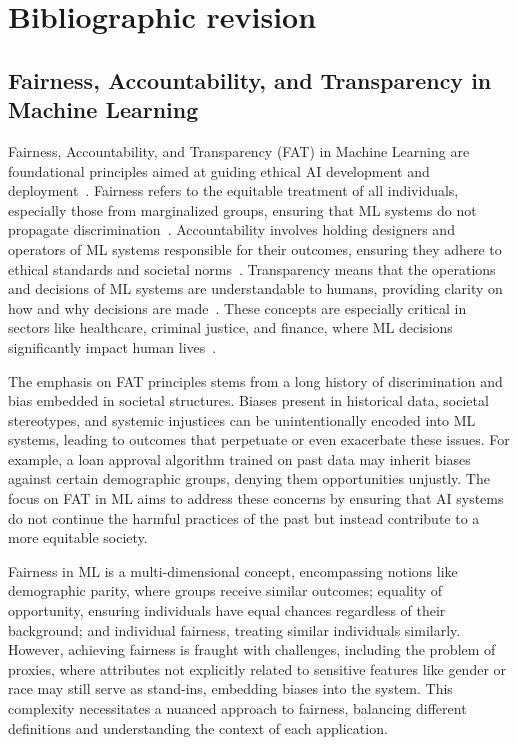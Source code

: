 
\chapter{Bibliographic revision}

\section{Fairness, Accountability, and Transparency in Machine Learning}

Fairness, Accountability, and Transparency (FAT) in Machine Learning are foundational principles aimed at guiding ethical AI development and deployment~\cite{}. Fairness refers to the equitable treatment of all individuals, especially those from marginalized groups, ensuring that ML systems do not propagate discrimination~\cite{}. Accountability involves holding designers and operators of ML systems responsible for their outcomes, ensuring they adhere to ethical standards and societal norms~\cite{}. Transparency means that the operations and decisions of ML systems are understandable to humans, providing clarity on how and why decisions are made~\cite{}. These concepts are especially critical in sectors like healthcare, criminal justice, and finance, where ML decisions significantly impact human lives~\cite{}.


The emphasis on FAT principles stems from a long history of discrimination and bias embedded in societal structures. Biases present in historical data, societal stereotypes, and systemic injustices can be unintentionally encoded into ML systems, leading to outcomes that perpetuate or even exacerbate these issues. For example, a loan approval algorithm trained on past data may inherit biases against certain demographic groups, denying them opportunities unjustly. The focus on FAT in ML aims to address these concerns by ensuring that AI systems do not continue the harmful practices of the past but instead contribute to a more equitable society.


Fairness in ML is a multi-dimensional concept, encompassing notions like demographic parity, where groups receive similar outcomes; equality of opportunity, ensuring individuals have equal chances regardless of their background; and individual fairness, treating similar individuals similarly. However, achieving fairness is fraught with challenges, including the problem of proxies, where attributes not explicitly related to sensitive features like gender or race may still serve as stand-ins, embedding biases into the system. This complexity necessitates a nuanced approach to fairness, balancing different definitions and understanding the context of each application.

